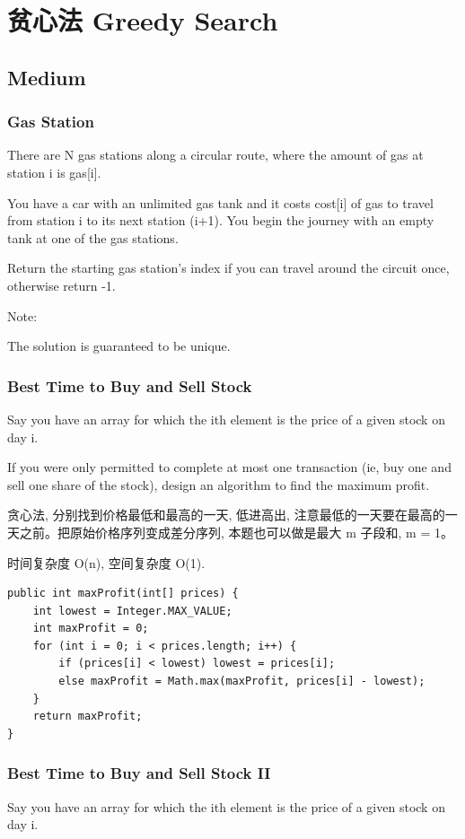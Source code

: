 \documentclass[12pt]{book}
\begin{document}
\chapter{贫心法 Greedy Search}
\label{sec-13}
\section{Medium}
\label{sec-13-1}
\subsection{Gas Station}
\label{sec-13-1-1}
There are N gas stations along a circular route, where the amount of gas at station i is gas[i].

You have a car with an unlimited gas tank and it costs cost[i] of gas to travel from station i to its next station (i+1). You begin the journey with an empty tank at one of the gas stations.

Return the starting gas station's index if you can travel around the circuit once, otherwise return -1.

Note:

The solution is guaranteed to be unique.

\subsection{Best Time to Buy and Sell Stock}
\label{sec-13-1-2}
Say you have an array for which the ith element is the price of a given stock on day i.

If you were only permitted to complete at most one transaction (ie, buy one and sell one share of the stock), design an algorithm to find the maximum profit.

贪心法, 分别找到价格最低和最高的一天, 低进高出, 注意最低的一天要在最高的一天之前。把原始价格序列变成差分序列, 本题也可以做是最大 m 子段和, m = 1。

时间复杂度 O(n), 空间复杂度 O(1).

\lstset{language=java,label= ,caption= ,numbers=none}
\begin{lstlisting}
public int maxProfit(int[] prices) {
    int lowest = Integer.MAX_VALUE;
    int maxProfit = 0;
    for (int i = 0; i < prices.length; i++) {
        if (prices[i] < lowest) lowest = prices[i];
        else maxProfit = Math.max(maxProfit, prices[i] - lowest);
    }
    return maxProfit;
}
\end{lstlisting}

\subsection{Best Time to Buy and Sell Stock II}
\label{sec-13-1-3}
Say you have an array for which the ith element is the price of a given stock on day i.
\end{document}
